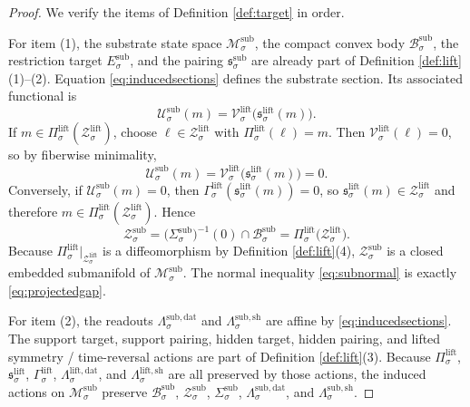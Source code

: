 \documentclass[11pt]{article}
\newcommand{\SubSpace}[1]{\mathcal M_{#1}^{\mathrm{sub}}}
\newcommand{\SubBody}[1]{\mathcal B_{#1}^{\mathrm{sub}}}
\newcommand{\SubTarget}[1]{E_{#1}^{\mathrm{sub}}}
\newcommand{\SubPair}[1]{\mathfrak s_{#1}^{\mathrm{sub}}}
\newcommand{\SubSection}[1]{\Sigma_{#1}^{\mathrm{sub}}}
\newcommand{\SubFunctional}[1]{\mathscr U_{#1}^{\mathrm{sub}}}
\newcommand{\SubShellSet}[1]{\mathcal Z_{#1}^{\mathrm{sub}}}
\newcommand{\SubData}[1]{\Lambda_{#1}^{\mathrm{sub,dat}}}
\newcommand{\SubShellMap}[1]{\Lambda_{#1}^{\mathrm{sub,sh}}}
\newcommand{\LiftProj}[1]{\Pi_{#1}^{\mathrm{lift}}}
\newcommand{\LiftSelect}[1]{\mathfrak s_{#1}^{\mathrm{lift}}}
\newcommand{\LiftSection}[1]{\Gamma_{#1}^{\mathrm{lift}}}
\newcommand{\LiftFunctional}[1]{\mathscr V_{#1}^{\mathrm{lift}}}
\newcommand{\LiftData}[1]{\Lambda_{#1}^{\mathrm{lift,dat}}}
\newcommand{\LiftShellMap}[1]{\Lambda_{#1}^{\mathrm{lift,sh}}}
\newcommand{\LiftShellSet}[1]{\mathcal Z_{#1}^{\mathrm{lift}}}
\begin{document}
\begin{proof}
We verify the items of Definition \ref{def:target} in order.

For item (1), the substrate state space \(\SubSpace{\sigma}\), the compact convex body \(\SubBody{\sigma}\), the restriction target \(\SubTarget{\sigma}\), and the pairing \(\SubPair{\sigma}\) are already part of Definition \ref{def:lift}(1)--(2). Equation \eqref{eq:inducedsections} defines the substrate section. Its associated functional is
\[
\SubFunctional{\sigma}(m)
=
\LiftFunctional{\sigma}\bigl(\LiftSelect{\sigma}(m)\bigr).
\]
If \(m\in\LiftProj{\sigma}(\LiftShellSet{\sigma})\), choose \(\ell\in\LiftShellSet{\sigma}\) with \(\LiftProj{\sigma}(\ell)=m\). Then \(\LiftFunctional{\sigma}(\ell)=0\), so by fiberwise minimality,
\[
\SubFunctional{\sigma}(m)
=
\LiftFunctional{\sigma}\bigl(\LiftSelect{\sigma}(m)\bigr)
=0.
\]
Conversely, if \(\SubFunctional{\sigma}(m)=0\), then \(\LiftSection{\sigma}(\LiftSelect{\sigma}(m))=0\), so \(\LiftSelect{\sigma}(m)\in\LiftShellSet{\sigma}\) and therefore \(m\in\LiftProj{\sigma}(\LiftShellSet{\sigma})\). Hence
\[
\SubShellSet{\sigma}
=
\bigl(\SubSection{\sigma}\bigr)^{-1}(0)\cap\SubBody{\sigma}
=
\LiftProj{\sigma}\bigl(\LiftShellSet{\sigma}\bigr).
\]
Because \(\LiftProj{\sigma}\big|_{\LiftShellSet{\sigma}}\) is a diffeomorphism by Definition \ref{def:lift}(4), \(\SubShellSet{\sigma}\) is a closed embedded submanifold of \(\SubSpace{\sigma}\). The normal inequality \eqref{eq:subnormal} is exactly \eqref{eq:projectedgap}.

For item (2), the readouts \(\SubData{\sigma}\) and \(\SubShellMap{\sigma}\) are affine by \eqref{eq:inducedsections}. The support target, support pairing, hidden target, hidden pairing, and lifted symmetry / time-reversal actions are part of Definition \ref{def:lift}(3). Because \(\LiftProj{\sigma}\), \(\LiftSelect{\sigma}\), \(\LiftSection{\sigma}\), \(\LiftData{\sigma}\), and \(\LiftShellMap{\sigma}\) are all preserved by those actions, the induced actions on \(\SubSpace{\sigma}\) preserve \(\SubBody{\sigma}\), \(\SubShellSet{\sigma}\), \(\SubSection{\sigma}\), \(\SubData{\sigma}\), and \(\SubShellMap{\sigma}\).


\end{proof}
\end{document}
